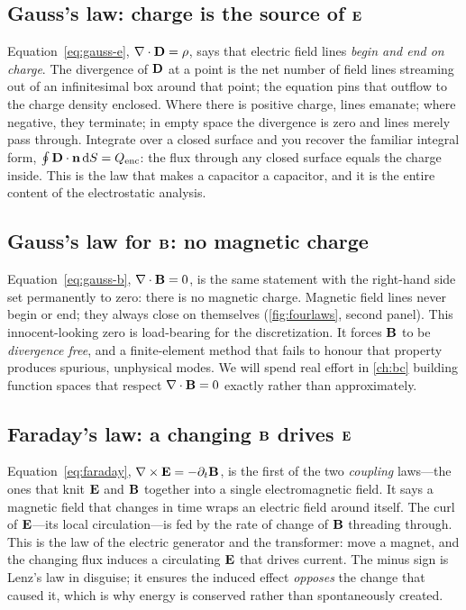 \subsection{Gauss's law: charge is the source of \texorpdfstring{$\mathbf{E}$}{E}}

Equation~\eqref{eq:gauss-e}, $\nabla\cdot\mathbf{D}=\rho$, says that electric field lines
\emph{begin and end on charge}. The divergence of $\mathbf{D}$ at a point is the net
number of field lines streaming out of an infinitesimal box around that
point; the equation pins that outflow to the charge density enclosed. Where
there is positive charge, lines emanate; where negative, they terminate; in
empty space the divergence is zero and lines merely pass through. Integrate
over a closed surface and you recover the familiar integral form,
$\oint \mathbf{D}\cdot\mathbf{n}\,\mathrm{d}S = Q_{\text{enc}}$: the flux through any closed
surface equals the charge inside. This is the law that makes a capacitor a
capacitor, and it is the entire content of the electrostatic analysis.

\subsection{Gauss's law for \texorpdfstring{$\mathbf{B}$}{B}: no magnetic charge}

Equation~\eqref{eq:gauss-b}, $\nabla\cdot\mathbf{B}=0$, is the same statement with the
right-hand side set permanently to zero: there is no magnetic charge. Magnetic
field lines never begin or end; they always close on themselves
(\cref{fig:fourlaws}, second panel). This innocent-looking zero is
load-bearing for the discretization. It forces $\mathbf{B}$ to be \emph{divergence
free}, and a finite-element method that fails to honour that property produces
spurious, unphysical modes. We will spend real effort in \cref{ch:bc} building
function spaces that respect $\nabla\cdot\mathbf{B}=0$ exactly rather than approximately.

\subsection{Faraday's law: a changing \texorpdfstring{$\mathbf{B}$}{B} drives \texorpdfstring{$\mathbf{E}$}{E}}

Equation~\eqref{eq:faraday}, $\nabla\times\mathbf{E}=-\partial_t\mathbf{B}$, is the first of the two
\emph{coupling} laws---the ones that knit $\mathbf{E}$ and $\mathbf{B}$ together into a single
electromagnetic field. It says a magnetic field that changes in time wraps an
electric field around itself. The curl of $\mathbf{E}$---its local circulation---is
fed by the rate of change of $\mathbf{B}$ threading through. This is the law of the
electric generator and the transformer: move a magnet, and the changing flux
induces a circulating $\mathbf{E}$ that drives current. The minus sign is Lenz's law
in disguise; it ensures the induced effect \emph{opposes} the change that
caused it, which is why energy is conserved rather than spontaneously created.


